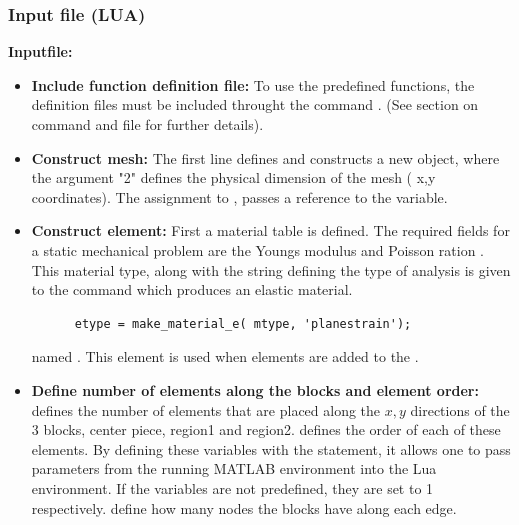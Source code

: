 \clearpage
\subsubsection*{Input file (LUA)}
\begin{flushleft}
  \textbf{Inputfile:}
  \\
\end{flushleft}
\hspace{1in}
{\footnotesize
{}
}

\clearpage
\begin{itemize}

  \item{\textbf{Include function definition file:}}
  To use the predefined functions, the definition files
  must be included throught the command .
  (See section on  command and file 
  for further details).

  \item{\textbf{Construct mesh:}}
  The first line defines and constructs 
  a new  object, where the
  argument "2" defines the physical dimension of
  the mesh ( x,y coordinates). The assignment to 
  , passes a reference to the variable.

  \item{\textbf{Construct element:}}
  First a material table  is defined. The
  required fields for a static mechanical problem are 
  the Youngs modulus  and Poisson ration .
  This material type, along with the string defining the 
  type of analysis is given to the command 
  which produces an elastic material.
  \begin{verbatim}
      etype = make_material_e( mtype, 'planestrain');
  \end{verbatim}
  named .
  This element is used when elements are added to the .

  \item{\textbf{Define number of elements along the blocks and element order:}}
   defines the number of elements that are placed along
  the $x,y$ directions of the 3 blocks, center piece, region1 and region2.
   defines the order of each of these elements. By defining
  these variables with the  statement, it allows one to pass
  parameters from the running MATLAB environment into the Lua environment.
  If the variables  are not predefined, they are 
  set to 1 respectively.  define how many nodes the 
  blocks have along each edge. 


\end{itemize}

